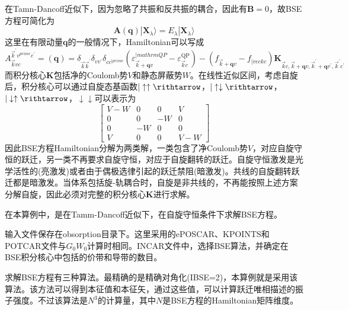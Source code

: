 在\textrm{Tamn-Dancoff}近似下，因为忽略了共振和反共振的耦合，因此有$\mathbf{B}=0$，故\textrm{BSE}方程可简化为
\begin{displaymath}
	\mathbf{A}(\mathbf{q})|\mathbf{X}_{\lambda}\rangle=E_{\lambda}|\mathbf{X}_{\lambda}\rangle
\end{displaymath}
这里在有限动量$\mathbf{q}$的一般情况下，\textrm{Hamiltonian}可以写成
\begin{displaymath}
	A_{\vec k vc}^{\vec k^{\prime}v^{prime}c^{\prime}}=(\mathbf{q})=\delta_{\vec k\vec k^{\prime}}\delta_{vv^{\prime}}\delta_{cc^{|prime}}(\varepsilon_{\vec k+\mathbf{q}v}^{|mathrm{QP}}-\varepsilon_{\vec k c}^{\mathrm{QP}})-(f_{\vec k+\mathbf{q}v}-f_{|vec kc})\mathbf{K}_{\vec k c,\vec k+\mathbf{q}v,\vec k^{\prime}+\mathbf{q}v^{\prime},\vec k^{\prime}c^{\prime}}
\end{displaymath}
而积分核心$\mathbf{K}$包括净的\textrm{Coulomb}势$V$和静态屏蔽势$W$。在线性近似区间，考虑自旋后，积分核心可以通过自旋态基函数$|\uparrow\uparrow\rithtarrow$，$|\uparrow\downarrow\rithtarrow$，$|\downarrow\uparrow\rithtarrow$，$\downarrow\downarrow$可以表示为
\begin{displaymath}
	\begin{bmatrix}
		V-W & 0 & 0 & V\\
		0 & 0 & -W & 0\\
		0 & -W & 0 & 0\\
		V & 0 & 0 & V-W
	\end{bmatrix}
\end{displaymath}
因此\textrm{BSE}方程\textrm{Hamiltonian}分解为两类解，一类包含了净\textrm{Coulomb}势$V$，对应自旋守恒的跃迁，另一类不再要求自旋守恒，对应于自旋翻转的跃迁。自旋守恒激发是光学活性的(亮激发)或者由于偶极选律引起的跃迁禁阻(暗激发)。共线的自旋翻转跃迁都是暗激发。当体系包括旋-轨耦合时，自旋是非共线的，不再能按照上述方案分解自旋，因此必须对完整的积分核心$\mathbf{K}$进行求解。

在本算例中，是在\textrm{Tamm-Dancoff}近似下，在自旋守恒条件下求解\textrm{BSE}方程。

输入文件保存在\textrm{obsorption}目录下。这里采用的e\textrm{POSCAR}、\textrm{KPOINTS}和\textrm{POTCAR}文件与$G_0W_0$计算时相同。\textrm{INCAR}文件中，选择\textrm{BSE}算法，并确定在\textrm{BSE}积分核心中包括的价带和导带的数目。

求解\textrm{BSE}方程有三种算法。最精确的是精确对角化\textrm{(IBSE=2)}，本算例就是采用该算法。该方法可以得到本征值和本征矢，通过这些值，可以计算跃迁唯相描述的振子强度。不过该算法是$N^3$的计算量，其中$N$是\textrm{BSE}方程的\textrm{Hamiltonian}矩阵维度。

